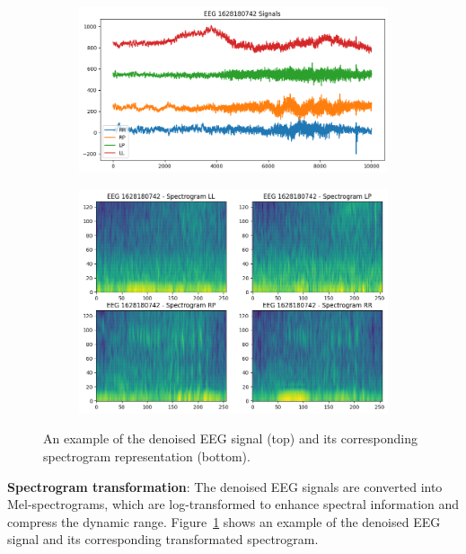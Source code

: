 \documentclass[conference]{IEEEtran}
\let\proglang=\textsf
\let\pkg=\texttt
\begin{document}
\begin{figure}[tp]
\centering
\begin{subfigure}[b]{0.45\textwidth}
\includegraphics[width=\textwidth]{EEG_Signal}
\end{subfigure}
\hfill
\begin{subfigure}[b]{0.45\textwidth}
\includegraphics[width=\textwidth]{EEG_Spectrogram}
\end{subfigure}
\caption{An example of the denoised EEG signal (top) and its corresponding
spectrogram representation (bottom).}
\label{fig:EEG}
\end{figure}


\textbf{Spectrogram transformation}: The denoised EEG signals are converted
into Mel-spectrograms, which are log-transformed to enhance spectral
information and compress the dynamic range. Figure~\ref{fig:EEG} shows an
example of the denoised EEG signal and its corresponding transformated
spectrogram.
\end{document}
